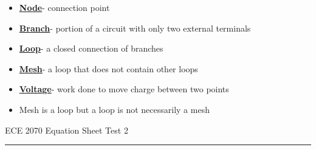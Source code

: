\documentclass [12pt] {article}
\begin{document}
\begin{multicols*}{2}
\begin{itemize}
		\item \underline{\textbf{Node}}- connection point \\
		\item \underline{\textbf{Branch}}- portion of a circuit with only two external terminals \\
		\item \underline{\textbf{Loop}}- a closed connection of branches \\
		\item \underline{\textbf{Mesh}}- a loop that does not contain other loops \\
		\item \underline{\textbf{Voltage}}- work done to move charge between two points \\
		\item Mesh is a loop but a loop is not necessarily a mesh
	\end{itemize}
\end{multicols*}
\newpage
ECE 2070 Equation Sheet \hfill Test 2 \\
\rule{7.6in}{0.4pt}
\end{document}
